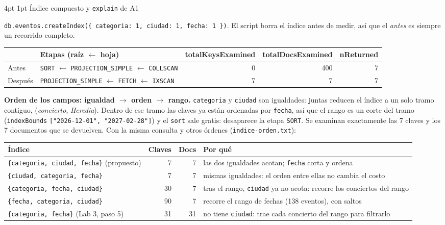 \documentclass[10pt,letterpaper]{article}
\makeatletter
\renewcommand\subsection{\@startsection{subsection}{2}{\z@}%
  {4pt \@plus 1pt}{1pt}%
  {\normalfont\small\bfseries\color{acc}}}
\makeatother
\begin{document}
\subsection{Índice compuesto y \texttt{explain} de A1}

\texttt{db.eventos.createIndex(\{ categoria: 1, ciudad: 1, fecha: 1 \})}. El script borra el índice antes de
medir, así que el \emph{antes} es siempre un recorrido completo.

\begin{center}\footnotesize
\begin{tabular}{@{}llrrr@{}}
\toprule
& \textbf{Etapas (raíz $\leftarrow$ hoja)} & \textbf{totalKeysExamined} & \textbf{totalDocsExamined} & \textbf{nReturned} \\
\midrule
Antes   & \texttt{SORT} $\leftarrow$ \texttt{PROJECTION\_SIMPLE} $\leftarrow$ \texttt{COLLSCAN} & 0 & 400 & 7 \\
Después & \texttt{PROJECTION\_SIMPLE} $\leftarrow$ \texttt{FETCH} $\leftarrow$ \texttt{IXSCAN} & 7 & 7 & 7 \\
\bottomrule
\end{tabular}
\end{center}

\textbf{Orden de los campos: igualdad $\rightarrow$ orden $\rightarrow$ rango.} \texttt{categoria} y
\texttt{ciudad} son igualdades: juntas reducen el índice a un solo tramo contiguo, (\emph{concierto},
\emph{Heredia}). Dentro de ese tramo las claves ya están ordenadas por \texttt{fecha}, así que el rango es un
corte del tramo (\texttt{indexBounds} \texttt{["2026-12-01", "2027-02-28"]}) y el \texttt{sort} sale gratis:
desaparece la etapa \texttt{SORT}. Se examinan exactamente las 7 claves y los 7 documentos que se devuelven.
Con la misma consulta y otros órdenes (\texttt{indice-orden.txt}):

\begin{center}\footnotesize
\begin{tabular}{@{}lrrl@{}}
\toprule
\textbf{Índice} & \textbf{Claves} & \textbf{Docs} & \textbf{Por qué} \\
\midrule
\texttt{\{categoria, ciudad, fecha\}} (propuesto) & 7 & 7 & las dos igualdades acotan; \texttt{fecha} corta y ordena \\
\texttt{\{ciudad, categoria, fecha\}} & 7 & 7 & mismas igualdades: el orden entre ellas no cambia el costo \\
\texttt{\{categoria, fecha, ciudad\}} & 30 & 7 & tras el rango, \texttt{ciudad} ya no acota: recorre los conciertos del rango \\
\texttt{\{fecha, categoria, ciudad\}} & 90 & 7 & recorre el rango de fechas (138 eventos), con saltos \\
\texttt{\{categoria, fecha\}} (Lab 3, paso 5) & 31 & 31 & no tiene \texttt{ciudad}: trae cada concierto del rango para filtrarlo \\
\bottomrule
\end{tabular}
\end{center}
\end{document}
